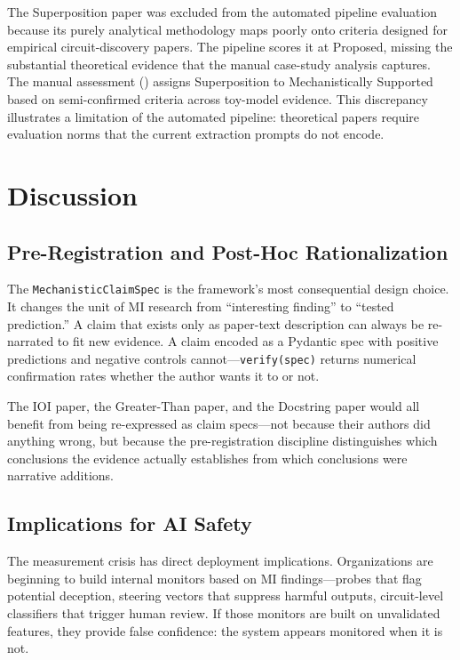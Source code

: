 \documentclass[10pt]{article}
\begin{document}
The Superposition paper \citep{elhage2022superposition} was excluded from the automated pipeline evaluation because its purely analytical methodology maps poorly onto criteria designed for empirical circuit-discovery papers. The pipeline scores it at Proposed, missing the substantial theoretical evidence that the manual case-study analysis captures. The manual assessment () assigns Superposition to Mechanistically Supported based on semi-confirmed criteria across toy-model evidence. This discrepancy illustrates a limitation of the automated pipeline: theoretical papers require evaluation norms that the current extraction prompts do not encode.

\section{Discussion}
\label{sec:discussion}

\subsection{Pre-Registration and Post-Hoc Rationalization}

The \texttt{MechanisticClaimSpec} is the framework's most consequential design choice. It changes the unit of MI research from ``interesting finding'' to ``tested prediction.'' A claim that exists only as paper-text description can always be re-narrated to fit new evidence. A claim encoded as a Pydantic spec with positive predictions and negative controls cannot---\texttt{verify(spec)} returns numerical confirmation rates whether the author wants it to or not.

The IOI paper, the Greater-Than paper, and the Docstring paper would all benefit from being re-expressed as claim specs---not because their authors did anything wrong, but because the pre-registration discipline distinguishes which conclusions the evidence actually establishes from which conclusions were narrative additions.

\subsection{Implications for AI Safety}

The measurement crisis has direct deployment implications. Organizations are beginning to build internal monitors based on MI findings---probes that flag potential deception, steering vectors that suppress harmful outputs, circuit-level classifiers that trigger human review. If those monitors are built on unvalidated features, they provide false confidence: the system appears monitored when it is not.
\end{document}
